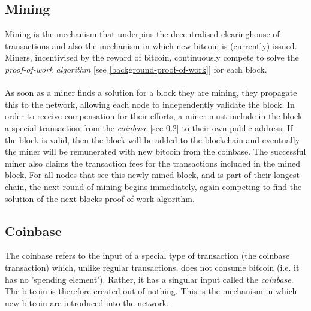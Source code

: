 \subsection{Mining}\label{background-mining}
Mining is the mechanism that underpins the decentralised clearinghouse of transactions and also the mechanism in which new bitcoin is (currently) issued. Miners, incentivised by the reward of bitcoin, continuously compete to solve the \textit{proof-of-work algorithm} [see \ref{background-proof-of-work}] for each block. 
\\\\
As soon as a miner finds a solution for a block they are mining, they propagate this to the network, allowing each node to independently validate the block. In order to receive compensation for their efforts, a miner must include in the block a special transaction from the \textit{coinbase} [see \ref{background-coinbase}] to their own public address. If the block is valid, then the block will be added to the blockchain and eventually the miner will be remunerated with new bitcoin from the coinbase. The successful miner also claims the transaction fees for the transactions included in the mined block. For all nodes that see this newly mined block, and is part of their longest chain, the next round of mining begins immediately, again competing to find the solution of the next blocks proof-of-work algorithm. 

\subsection{Coinbase}\label{background-coinbase}
The coinbase refers to the input of a special type of transaction (the coinbase transaction) which, unlike regular transactions, does not consume bitcoin (i.e. it has no 'spending element'). Rather, it has a singular input called the \textit{coinbase}. The bitcoin is therefore created out of nothing. This is the mechanism in which new bitcoin are introduced into the network. 

